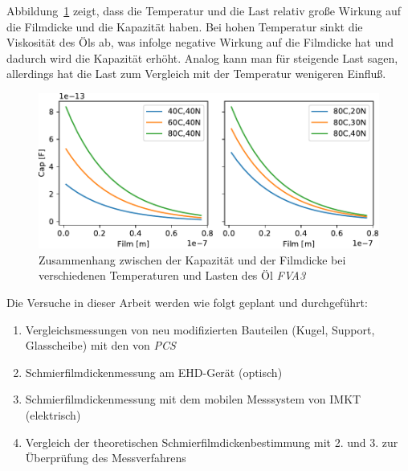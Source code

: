Abbildung~\ref{fig:film_cap_with_dif_temp_and_load} zeigt, dass die Temperatur und die Last relativ große Wirkung auf die Filmdicke und die Kapazität haben.
Bei hohen Temperatur sinkt die Viskosität des Öls ab, was infolge negative Wirkung auf die Filmdicke hat und dadurch wird die Kapazität erhöht.
Analog kann man für steigende Last sagen, allerdings hat die Last zum Vergleich mit der Temperatur wenigeren Einfluß.
\begin{figure}[htb]
    \centering
    \includegraphics[]{./images/film_cap_with_dif_temp_and_load_fva3.pdf}
    \caption{Zusammenhang zwischen der Kapazität und der Filmdicke bei verschiedenen Temperaturen und Lasten des Öl \textit{FVA3}}
    \label{fig:film_cap_with_dif_temp_and_load}
\end{figure}

Die Versuche in dieser Arbeit werden wie folgt geplant und durchgeführt:
\begin{enumerate}
    \item Vergleichsmessungen von neu modifizierten Bauteilen (Kugel, Support, Glasscheibe) mit den von \textit{PCS}
    \item Schmierfilmdickenmessung am EHD-Gerät (optisch)
    \item Schmierfilmdickenmessung mit dem mobilen Messsystem von IMKT (elektrisch)
    \item Vergleich der theoretischen Schmierfilmdickenbestimmung mit 2. und 3. zur Überprüfung des Messverfahrens
\end{enumerate}

